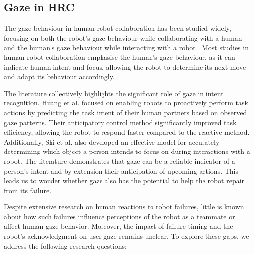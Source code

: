 \subsection{Gaze in HRC}
The gaze behaviour in human-robot collaboration has been studied widely, focusing on both the robot’s gaze behaviour while collaborating with a human and the human’s gaze behaviour while interacting with a robot \cite{srinivasan_survey_2011, admoni_social_2017}. Most studies in human-robot collaboration emphasise the human’s gaze behaviour, as it can indicate human intent and focus, allowing the robot to determine its next move and adapt its behaviour accordingly.  

The literature collectively highlights the significant role of gaze in intent recognition. Huang et al. \cite{huang_anticipatory_2016} focused on enabling robots to proactively perform task actions by predicting the task intent of their human partners based on observed gaze patterns. Their anticipatory control method significantly improved task efficiency, allowing the robot to respond faster compared to the reactive method. %
Additionally, Shi et al. \cite{shi_gazeemd_2021} also developed an effective model for accurately determining which object a person intends to focus on during interactions with a robot. The literature demonstrates that gaze can be a reliable indicator of a person's intent and by extension their anticipation of upcoming actions. This leads us to wonder whether gaze also has the potential to help the robot repair from its failure.


Despite extensive research on human reactions to robot failures, little is known about how such failures influence perceptions of the robot as a teammate or affect human gaze behavior. Moreover, the impact of failure timing and the robot's acknowledgment on user gaze remains unclear. To explore these gaps, we address the following research questions:

